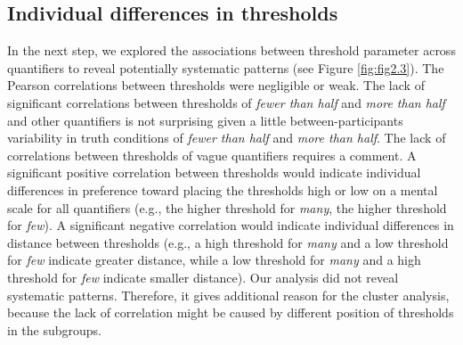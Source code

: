 \documentclass{article}
\begin{document}
\subsection{Individual differences in thresholds}
In the next step, we explored the associations between threshold parameter across quantifiers to reveal potentially systematic patterns (see Figure \ref{fig:fig2.3}).
The Pearson correlations between thresholds were negligible or weak. The lack of significant correlations between thresholds of \textit{fewer than half} and \textit{more than half} and other quantifiers is not surprising given a little between-participants variability in truth conditions of \textit{fewer than half} and \textit{more than half}. The lack of correlations between thresholds of vague quantifiers requires a comment.
A significant positive correlation between thresholds would indicate individual differences in preference toward placing the thresholds high or low on a mental scale for all quantifiers (e.g., the higher threshold for \textit{many}, the higher threshold for \textit{few}). A significant negative correlation would indicate individual differences in distance between thresholds (e.g., a high threshold for \textit{many} and a low threshold for \textit{few} indicate greater distance, while a low threshold for \textit{many} and a high threshold for \textit{few} indicate smaller distance). %
Our analysis did not reveal systematic patterns. Therefore, it gives additional reason for the cluster analysis, because the lack of correlation might be caused by different position of thresholds in the subgroups.
\end{document}
